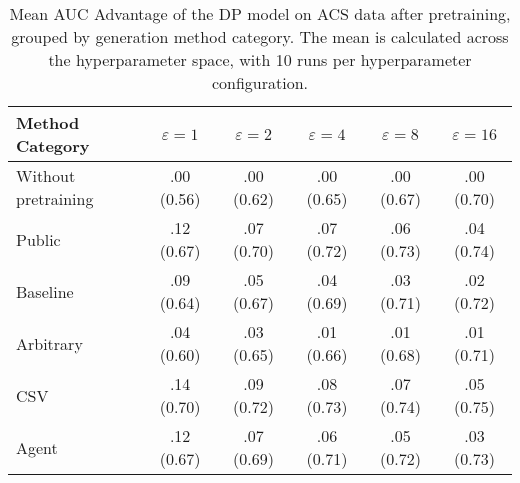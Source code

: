 \begin{table}[h!]
    \centering
    \caption{Mean AUC Advantage of the DP model on ACS data after pretraining, grouped by generation method category. The mean is calculated across the hyperparameter space, with 10 runs per hyperparameter configuration.}
    \label{tab:epsilon_comparison}
    \begin{tabular}{lccccc}
    \toprule
    Method Category & $\varepsilon=1$ & $\varepsilon=2$ & $\varepsilon=4$ & $\varepsilon=8$ & $\varepsilon=16$ \\
    \midrule
    Without pretraining & .00 {\small (0.56)} & .00 {\small (0.62)} & .00 {\small (0.65)} & .00 {\small (0.67)} & .00 {\small (0.70)} \\
    \arrayrulecolor{black!50!}\midrule
    Public & \cellcolor{silver!30}.12 {\small (0.67)} & \cellcolor{silver!30}.07 {\small (0.70)} & \cellcolor{silver!30}.07 {\small (0.72)} & \cellcolor{silver!30}.06 {\small (0.73)} & \cellcolor{silver!30}.04 {\small (0.74)} \\
    \arrayrulecolor{black!50!}\midrule
    Baseline & .09 {\small (0.64)} & .05 {\small (0.67)} & .04 {\small (0.69)} & .03 {\small (0.71)} & .02 {\small (0.72)} \\
    \arrayrulecolor{black!50!}\midrule
    Arbitrary & .04 {\small (0.60)} & .03 {\small (0.65)} & .01 {\small (0.66)} & .01 {\small (0.68)} & .01 {\small (0.71)} \\
    \arrayrulecolor{black!50!}\midrule
    CSV & \cellcolor{gold!30}.14 {\small (0.70)} & \cellcolor{gold!30}.09 {\small (0.72)} & \cellcolor{gold!30}.08 {\small (0.73)} & \cellcolor{gold!30}.07 {\small (0.74)} & \cellcolor{gold!30}.05 {\small (0.75)} \\
    Agent & \cellcolor{bronze!30}.12 {\small (0.67)} & \cellcolor{bronze!30}.07 {\small (0.69)} & \cellcolor{bronze!30}.06 {\small (0.71)} & \cellcolor{bronze!30}.05 {\small (0.72)} & \cellcolor{bronze!30}.03 {\small (0.73)} \\
    \bottomrule
    \end{tabular}
\end{table}